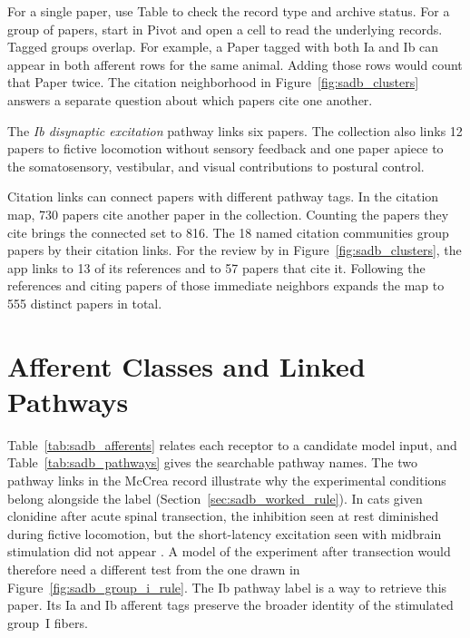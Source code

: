 For a single paper, use Table to check the record type and archive status. For a group of papers, start in Pivot and open a cell to read the underlying records. Tagged groups overlap. For example, a Paper tagged with both Ia and Ib can appear in both afferent rows for the same animal. Adding those rows would count that Paper twice. The citation neighborhood in Figure~\ref{fig:sadb_clusters} answers a separate question about which papers cite one another.

The \emph{Ib disynaptic excitation} pathway links six papers. The collection also links 12 papers to fictive locomotion without sensory feedback and one paper apiece to the somatosensory, vestibular, and visual contributions to postural control.

Citation links can connect papers with different pathway tags. In the citation map, 730 papers cite another paper in the collection. Counting the papers they cite brings the connected set to 816. The 18 named citation communities group papers by their citation links. For the review by \citet{grillner_neurobiological_1985} in Figure~\ref{fig:sadb_clusters}, the app links to 13 of its references and to 57 papers that cite it. Following the references and citing papers of those immediate neighbors expands the map to 555 distinct papers in total.

\section{Afferent Classes and Linked Pathways}

Table~\ref{tab:sadb_afferents} relates each receptor to a candidate model input, and Table~\ref{tab:sadb_pathways} gives the searchable pathway names. The two pathway links in the McCrea record illustrate why the experimental conditions belong alongside the label (Section~\ref{sec:sadb_worked_rule}). In cats given clonidine after acute spinal transection, the inhibition seen at rest diminished during fictive locomotion, but the short-latency excitation seen with midbrain stimulation did not appear \citep{mccrea_disynaptic_1995}. A model of the experiment after transection would therefore need a different test from the one drawn in Figure~\ref{fig:sadb_group_i_rule}. The Ib pathway label is a way to retrieve this paper. Its Ia and Ib afferent tags preserve the broader identity of the stimulated group~I fibers.

